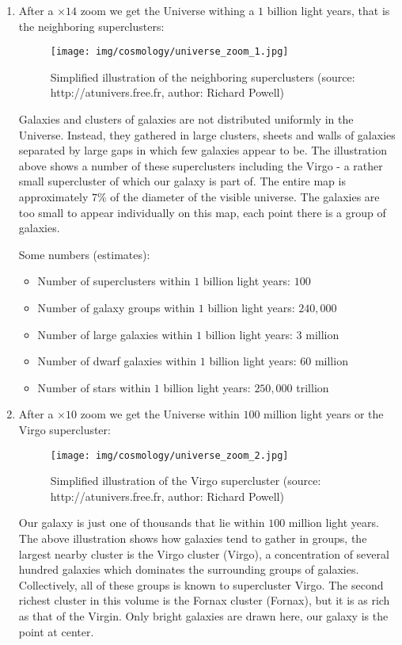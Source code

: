 \begin{enumerate}
		\item After a $\times 14$ zoom we get the Universe withing a $1$ billion light years, that is the neighboring superclusters:
		\begin{figure}[H]
			\centering
			\texttt{[image: img/cosmology/universe\_zoom\_1.jpg]}
			\caption[Simplified illustration of the neighboring superclusters]{Simplified illustration of the neighboring superclusters (source: http://atunivers.free.fr, author: Richard Powell)}
		\end{figure}
		Galaxies and clusters of galaxies are not distributed uniformly in the Universe. Instead, they gathered in large clusters, sheets and walls of galaxies separated by large gaps in which few galaxies appear to be. The illustration above shows a number of these superclusters including the Virgo - a rather small supercluster of which our galaxy is part of. The entire map is approximately $7\%$ of the diameter of the visible universe. The galaxies are too small to appear individually on this map, each point there is a group of galaxies.
		
		Some numbers (estimates):
		\begin{itemize}
			\item Number of superclusters within $1$ billion light years: $100$
			\item Number of galaxy groups within $1$ billion light years: $240,000$
			\item Number of large galaxies within $1$ billion light years: $3$ million
			\item Number of dwarf galaxies within $1$ billion light years: $60$ million
			\item Number of stars within $1$ billion light years: $250,000$ trillion
		\end{itemize}
		
		\item After a $\times 10$ zoom we get the Universe within $100$ million light years or the Virgo supercluster:
		\begin{figure}[H]
			\centering
			\texttt{[image: img/cosmology/universe\_zoom\_2.jpg]}
			\caption[Simplified illustration of the Virgo supercluster]{Simplified illustration of the Virgo supercluster (source: http://atunivers.free.fr, author: Richard Powell)}
		\end{figure}
		Our galaxy is just one of thousands that lie within $100$ million light years. The above illustration shows how galaxies tend to gather in groups, the largest nearby cluster is the Virgo cluster (Virgo), a concentration of several hundred galaxies which dominates the surrounding groups of galaxies. Collectively, all of these groups is known to supercluster Virgo. The second richest cluster in this volume is the Fornax cluster (Fornax), but it is as rich as that of the Virgin. Only bright galaxies are drawn here, our galaxy is the point at center.	
		

\end{enumerate}
